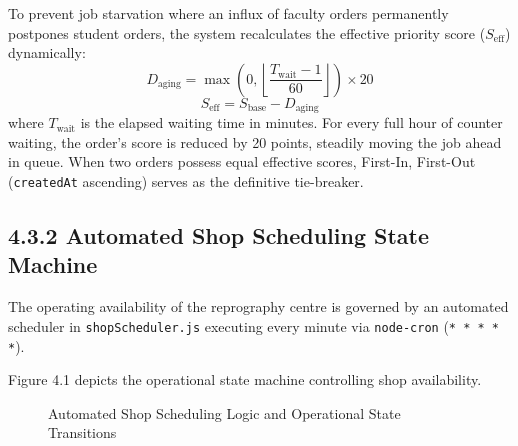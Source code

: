 \documentclass[12pt,a4paper,oneside]{report}
\begin{document}
To prevent job starvation where an influx of faculty orders permanently postpones student orders, the system recalculates the effective priority score ($S_{\text{eff}}$) dynamically:
\begin{equation}
D_{\text{aging}} = \max\left(0, \left\lfloor \frac{T_{\text{wait}} - 1}{60} \right\rfloor\right) \times 20
\end{equation}
\begin{equation}
S_{\text{eff}} = S_{\text{base}} - D_{\text{aging}}
\end{equation}
where $T_{\text{wait}}$ is the elapsed waiting time in minutes. For every full hour of counter waiting, the order's score is reduced by 20 points, steadily moving the job ahead in queue. When two orders possess equal effective scores, First-In, First-Out (\texttt{createdAt} ascending) serves as the definitive tie-breaker.

\subsection{4.3.2 Automated Shop Scheduling State Machine}
The operating availability of the reprography centre is governed by an automated scheduler in \texttt{shopScheduler.js} executing every minute via \texttt{node-cron} (\texttt{* * * * *}).

Figure 4.1 depicts the operational state machine controlling shop availability.

\begin{figure}[H]
\centering
{}
\caption{Automated Shop Scheduling Logic and Operational State Transitions}
\label{fig:shop_scheduler}
\end{figure}
\end{document}
